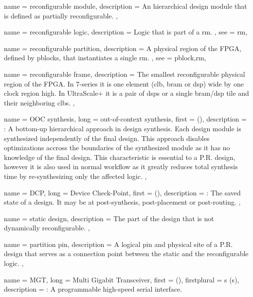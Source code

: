 {
	name = {reconfigurable module},
	description = {
		An hierarchical design module that is defined as partially reconfigurable.
	},
}


{
	name = {reconfigurable logic},
	description = {
		Logic that is part of a \gls{rm}.
	},
	see = {rm},
}


{
	name = {reconfigurable partition},
	description = {
		A physical region of the FPGA, defined by \glspl{pblock},
		that instantiates a single \gls{rm}.
	},
	see = {pblock,rm},
}

{
	name = {reconfigurable frame},
	description = {
		The smallest reconfigurable physical region of the FPGA. 
		In 7-series it is one element (\gls{clb}, \gls{bram} or \gls{dsp}) wide by one clock region high.
		In UltraScale+ it is a pair of \glspl{dsp} or a single \gls{bram}/\gls{dsp} 
		tile and their neighboring \glspl{clb}.
	},
}


{
	name = {OOC synthesis},
	long = {out-of-context synthesis},
	first = { ()},
	description = {\emph{}:
		A bottom-up hierarchical approach in design synthesis. 
		Each design module is synthesized independently of the final design.
		This approach disables optimizations accross the boundaries of the
		synthesized module as it has no knowledge of the final design.
		This characteristic is essential to a P.R. design, however it is also
		used in normal workflow as it greatly reduces total synthesis time by
		re-synthesizing only the affected logic.
	},
}

{
	name = {DCP},
	long = {Device Check-Point},
	first = { ()},
	description = {\emph{}:
		The saved state of a design. It may be at post-synthesis, post-placement or post-routing.
	},
}

{
	name = {static design},
	description = {
		The part of the design that is not dynamically reconfigurable.
	},
}

{
	name = {partition pin},
	description = {
		A logical pin and physical site of a P.R. design that 
		serves as a connection point between the static and the reconfigurable logic.
	},
}

{
	name = {MGT},
	long = {Multi Gigabit Transceiver},
	first = { ()},
	firstplural = {s (s)},
	description = {\emph{}:
		A programmable high-speed serial interface.
	}
}

